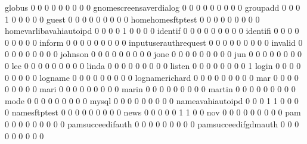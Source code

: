 \documentclass[compress,8pt]{beamer}
\begin{document}
\begin{frame}
\begin{Schunk}
  globus                                     0   0   0   0   0   0   0   0   0
  gnomescreensaverdialog                     0   0   0   0   0   0   0   0   0
  groupadd                                   0   0   0   1   0   0   0   0   0
  guest                                      0   0   0   0   0   0   0   0   0
  homehomesftptest                           0   0   0   0   0   0   0   0   0
  homevarlibavahiautoipd                     0   0   0   0   1   0   0   0   0
  identif                                    0   0   0   0   0   0   0   0   0
  identifi                                   0   0   0   0   0   0   0   0   0
  inform                                     0   0   0   0   0   0   0   0   0
  inputuserauthrequest                       0   0   0   0   0   0   0   0   0
  invalid                                    0   0   0   0   0   0   0   0   0
  johnson                                    0   0   0   0   0   0   0   0   0
  jone                                       0   0   0   0   0   0   0   0   0
  jun                                        0   0   0   0   0   0   0   0   0
  lee                                        0   0   0   0   0   0   0   0   0
  linda                                      0   0   0   0   0   0   0   0   0
  listen                                     0   0   0   0   0   0   0   0   1
  login                                      0   0   0   0   0   0   0   0   0
  logname                                    0   0   0   0   0   0   0   0   0
  lognamerichard                             0   0   0   0   0   0   0   0   0
  mar                                        0   0   0   0   0   0   0   0   0
  mari                                       0   0   0   0   0   0   0   0   0
  marin                                      0   0   0   0   0   0   0   0   0
  martin                                     0   0   0   0   0   0   0   0   0
  mode                                       0   0   0   0   0   0   0   0   0
  mysql                                      0   0   0   0   0   0   0   0   0
  nameavahiautoipd                           0   0   0   1   1   0   0   0   0
  namesftptest                               0   0   0   0   0   0   0   0   0
  news                                       0   0   0   0   0   1   1   0   0
  nov                                        0   0   0   0   0   0   0   0   0
  pam                                        0   0   0   0   0   0   0   0   0
  pamsucceedifauth                           0   0   0   0   0   0   0   0   0
  pamsucceedifgdmauth                        0   0   0   0   0   0   0   0   0

\end{Schunk}
\end{frame}
\end{document}
